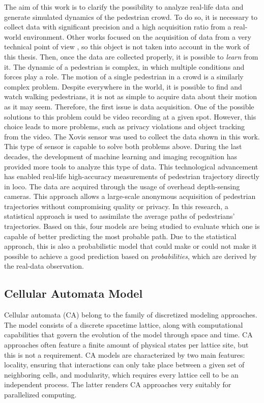\documentclass[class=article, crop=false]{standalone}
\begin{document}
The aim of this work is to clarify the possibility to analyze real-life data and generate simulated dynamics of the pedestrian crowd. 
To do so, it is necessary to collect data with significant precision and a high acquisition ratio from a real-world environment. 
Other works focused on the acquisition of data from a very technical point of view \cite{alecorbe}, so this object is not taken into account in the work of this thesis.
Then, once the data are collected properly, it is possible to \emph{learn} from it. 
The dynamic of a pedestrian is complex, in which multiple conditions and forces play a role. 
The motion of a single pedestrian in a crowd is a similarly complex problem. 
Despite everywhere in the world, it is possible to find and watch walking pedestrians, it is not as simple to acquire data about their motion as it may seem. 
Therefore, the first issue is data acquisition. 
One of the possible solutions to this problem could be video recording at a given spot. 
However, this choice leads to more problems, such as privacy violations and object tracking from the video. 
The Xovis sensor \cite{Xovis} was used to collect the data shown in this work. 
This type of sensor is capable to solve both problems above. During the last decades, the development of machine learning and imaging recognition has provided more tools to analyze this type of data. 
This technological advancement has enabled real-life high-accuracy measurements of pedestrian trajectory directly in loco. 
The data are acquired through the usage of overhead depth-sensing cameras. 
This approach allows a large-scale anonymous acquisition of pedestrian trajectories without compromising quality or privacy. 
In this research, a statistical approach is used to assimilate the average paths of pedestrians’ trajectories. 
Based on this, four models are being studied to evaluate which one is capable of better predicting the most probable path. 
Due to the statistical approach, this is also a probabilistic model that could make or could not make it possible to achieve a good prediction based on \emph{probabilities}, which are derived by the real-data observation.


\subsection{Cellular Automata Model}
Cellular automata (CA) belong to the family of discretized modeling approaches. The model consists of a discrete spacetime lattice, along with computational capabilities that govern the evolution of the model through space and time. CA approaches often feature a finite amount of physical states per lattice site, but this is not a requirement. CA models are characterized by two main features: locality, ensuring that interactions can only take place between a given set of neighboring cells, and modularity, which requires every lattice cell to be an independent process. The latter renders CA approaches very suitably for parallelized computing.
\end{document}
